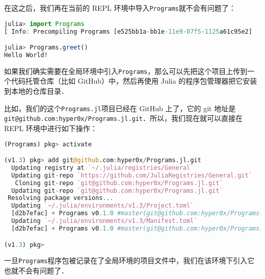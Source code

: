 在这之后，我们再在当前的 REPL 环境中导入\verb|Programs|就不会有问题了：

\begin{lstlisting}[language=julia]
julia> import Programs
[ Info: Precompiling Programs [e525bb1a-bb1e-11e9-07f5-1125a61c95e2]

julia> Programs.greet()
Hello World!
\end{lstlisting}

如果我们确实需要在全局环境中引入\verb|Programs|，那么可以先把这个项目上传到一个代码托管仓库（比如 GitHub）中，然后再使用 Julia 的程序包管理器把它安装到本地的仓库目录． 

比如，我们的这个\verb|Programs.jl|项目已经在 GitHub 上了，它的 git 地址是\verb|git@github.com:hyper0x/Programs.jl.git|．所以，我们现在就可以直接在 REPL 环境中进行如下操作：

\begin{lstlisting}[language=julia]
(Programs) pkg> activate

(v1.3) pkg> add git@github.com:hyper0x/Programs.jl.git
  Updating registry at `~/.julia/registries/General`
  Updating git-repo `https://github.com/JuliaRegistries/General.git`
   Cloning git-repo `git@github.com:hyper0x/Programs.jl.git`
  Updating git-repo `git@github.com:hyper0x/Programs.jl.git`
 Resolving package versions...
  Updating `~/.julia/environments/v1.3/Project.toml`
  [d2b7efac] + Programs v0.1.0 #master(git@github.com:hyper0x/Programs.jl.git)
  Updating `~/.julia/environments/v1.3/Manifest.toml`
  [d2b7efac] + Programs v0.1.0 #master(git@github.com:hyper0x/Programs.jl.git)

(v1.3) pkg> 
\end{lstlisting}

一旦\verb|Programs|程序包被记录在了全局环境的项目文件中，我们在该环境下引入它也就不会有问题了．